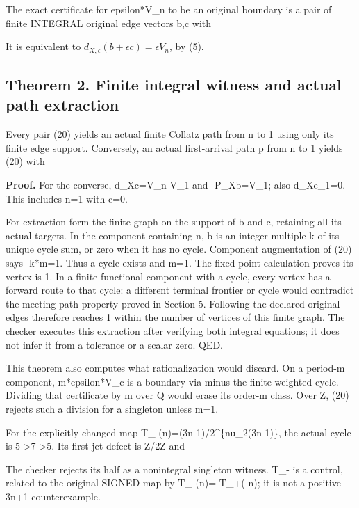 The exact certificate for epsilon*V\_n to be an original boundary is a
pair of finite INTEGRAL original edge vectors b,c with


It is equivalent to \(d_{X,\epsilon}(b+\epsilon c)=\epsilon V_n\), by
(5).

\subsection{Theorem 2. Finite integral witness and actual path
extraction}

Every pair (20) yields an actual finite Collatz path from n to 1 using
only its finite edge support. Conversely, an actual first-arrival path p
from n to 1 yields (20) with


\textbf{Proof.} For the converse, d\_Xc=V\_n-V\_1 and -P\_Xb=V\_1; also
d\_Xe\_1=0. This includes n=1 with c=0.

For extraction form the finite graph on the support of b and c,
retaining all its actual targets. In the component containing n, b is an
integer multiple k of its unique cycle sum, or zero when it has no
cycle. Component augmentation of (20) says -k*m=1. Thus a cycle exists
and m=1. The fixed-point calculation proves its vertex is 1. In a finite
functional component with a cycle, every vertex has a forward route to
that cycle: a different terminal frontier or cycle would contradict the
meeting-path property proved in Section 5. Following the declared
original edges therefore reaches 1 within the number of vertices of this
finite graph. The checker executes this extraction after verifying both
integral equations; it does not infer it from a tolerance or a scalar
zero. QED.

This theorem also computes what rationalization would discard. On a
period-m component, m*epsilon*V\_c is a boundary via minus the finite
weighted cycle. Dividing that certificate by m over Q would erase its
order-m class. Over Z, (20) rejects such a division for a singleton
unless m=1.

For the explicitly changed map T\_-(n)=(3n-1)/2\^{}\{nu\_2(3n-1)\}, the
actual cycle is 5-\textgreater7-\textgreater5. Its first-jet defect is
Z/2Z and


The checker rejects its half as a nonintegral singleton witness. T\_- is
a control, related to the original SIGNED map by T\_-(n)=-T\_+(-n); it
is not a positive 3n+1 counterexample.

